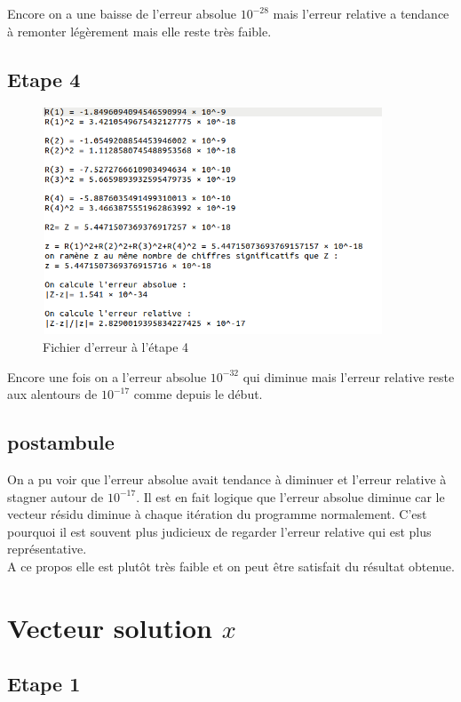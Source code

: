 \documentclass[12,french]{report}
\begin{document}
Encore on a une baisse de l'erreur absolue $10^{-28}$ mais l'erreur relative a tendance à remonter légèrement mais elle reste très faible.

\section{Etape 4}

\begin{figure}[H]
	\center
	\includegraphics[width=0.9\textwidth]{./Images/r_4_err}
	\caption{Fichier d'erreur à l'étape 4}
\end{figure}

Encore une fois on a l'erreur absolue $10^{-32}$ qui diminue mais l'erreur relative reste aux alentours de $10^{-17}$ comme depuis le début.

\section{postambule}

On a pu voir que l'erreur absolue avait tendance à diminuer et l'erreur relative à stagner autour de $10^{-17}$. Il est en fait logique que l'erreur absolue diminue car le vecteur résidu diminue à chaque itération du programme normalement. C'est pourquoi il est souvent plus judicieux de regarder l'erreur relative qui est plus représentative.\\
A ce propos elle est plutôt très faible et on peut être satisfait du résultat obtenue.

\chapter{Vecteur solution $x$} %

\section{Etape 1}
\end{document}
